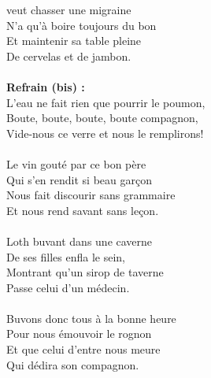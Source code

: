
 veut chasser une migraine
\\N'a qu'à boire toujours du bon
\\Et maintenir sa table pleine
\\De cervelas et de jambon.
\\\\\textbf{Refrain (bis) :}
\\L'eau ne fait rien que pourrir le poumon,
\\Boute, boute, boute, boute compagnon,
\\Vide-nous ce verre et nous le remplirons!
\\\\Le vin gouté par ce bon père
\\Qui s'en rendit si beau garçon
\\Nous fait discourir sans grammaire
\\Et nous rend savant sans leçon.
\\\\Loth buvant dans une caverne
\\De ses filles enfla le sein,
\\Montrant qu'un sirop de taverne
\\Passe celui d'un médecin.
\\\\Buvons donc tous à la bonne heure
\\Pour nous émouvoir le rognon
\\Et que celui d'entre nous meure
\\Qui dédira son compagnon.

\breakpage